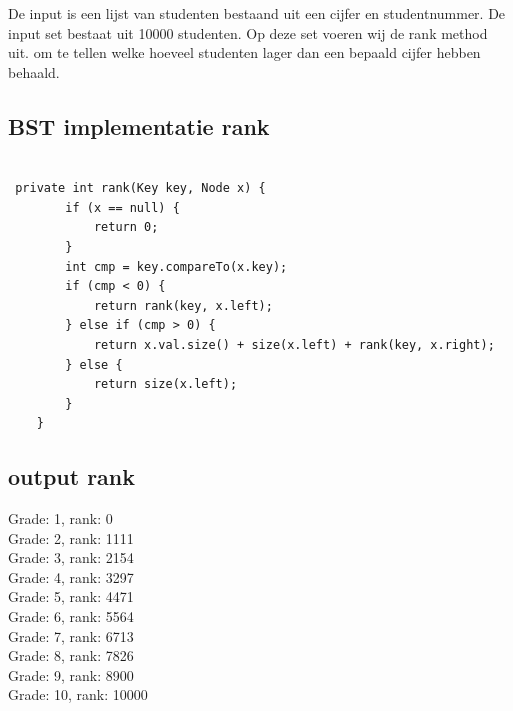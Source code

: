\documentclass[12pt,notitlepage]{article}
\begin{document}
De input is een lijst van studenten bestaand uit een cijfer en studentnummer. De input set bestaat uit 10000 studenten. Op deze set  voeren wij de rank method uit. om te tellen welke hoeveel studenten lager dan een bepaald cijfer hebben behaald. \\


\subsection{BST implementatie rank}

\begin{lstlisting}

 private int rank(Key key, Node x) {
        if (x == null) {
            return 0;
        }
        int cmp = key.compareTo(x.key);
        if (cmp < 0) {
            return rank(key, x.left);
        } else if (cmp > 0) {
            return x.val.size() + size(x.left) + rank(key, x.right);
        } else {
            return size(x.left);
        }
    }
\end{lstlisting}
\subsection{output rank}
Grade: 1, rank: 0 \\
Grade: 2, rank: 1111 \\
Grade: 3, rank: 2154 \\
Grade: 4, rank: 3297 \\
Grade: 5, rank: 4471 \\
Grade: 6, rank: 5564 \\
Grade: 7, rank: 6713 \\
Grade: 8, rank: 7826 \\
Grade: 9, rank: 8900 \\
Grade: 10, rank: 10000
\end{document}
